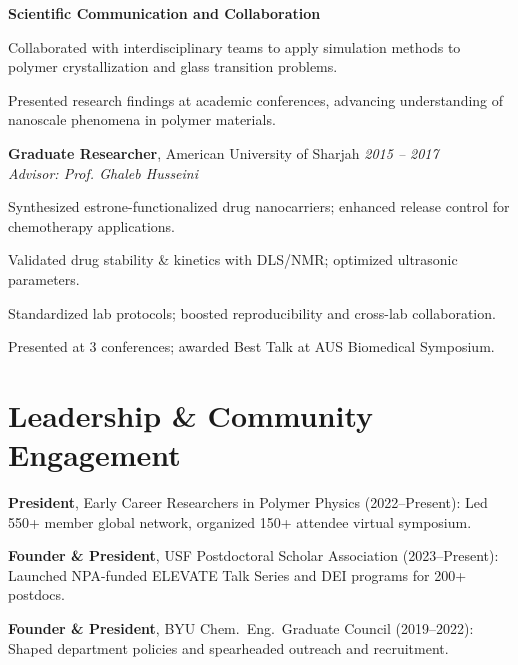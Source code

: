 \documentclass[letterpaper,12pt]{article}
\begin{document}
\vspace{0.5em}
\textbf{Scientific Communication and Collaboration}
\begin{tabitemize}
    \item Collaborated with interdisciplinary teams to apply simulation methods to polymer crystallization and glass transition problems.
    \item Presented research findings at academic conferences, advancing understanding of nanoscale phenomena in polymer materials.
\end{tabitemize}

\textbf{Graduate Researcher}, American University of Sharjah \hfill \textit{2015 – 2017} \\
\textit{Advisor: Prof. Ghaleb Husseini}
\begin{tabitemize}[leftmargin=*]
  \item Synthesized estrone-functionalized drug nanocarriers; enhanced release control for chemotherapy applications.
  \item Validated drug stability \& kinetics with DLS/NMR; optimized ultrasonic parameters.
  \item Standardized lab protocols; boosted reproducibility and cross-lab collaboration.
  \item Presented at 3 conferences; awarded Best Talk at AUS Biomedical Symposium.
\end{tabitemize}

\vspace{-0.3\baselineskip}
\section*{Leadership \& Community Engagement}
\begin{tabitemize}[leftmargin=*]
  \item \textbf{President}, Early Career Researchers in Polymer Physics (2022–Present): Led 550+ member global network, organized 150+ attendee virtual symposium.
  \item \textbf{Founder \& President}, USF Postdoctoral Scholar Association (2023–Present): Launched NPA-funded ELEVATE Talk Series and DEI programs for 200+ postdocs.
  \item \textbf{Founder \& President}, BYU Chem.~Eng.~Graduate Council (2019–2022): Shaped department policies and spearheaded outreach and recruitment.
\end{tabitemize}

\vspace{-0.3\baselineskip}
\begin{refsection}[articles]
  \nocite{*}
  \setlength\bibitemsep{0pt}
  \printbibliography[resetnumbers=true,type=article,title={Selected Peer-Reviewed Publications},heading=fix]
\end{refsection}
\end{document}
